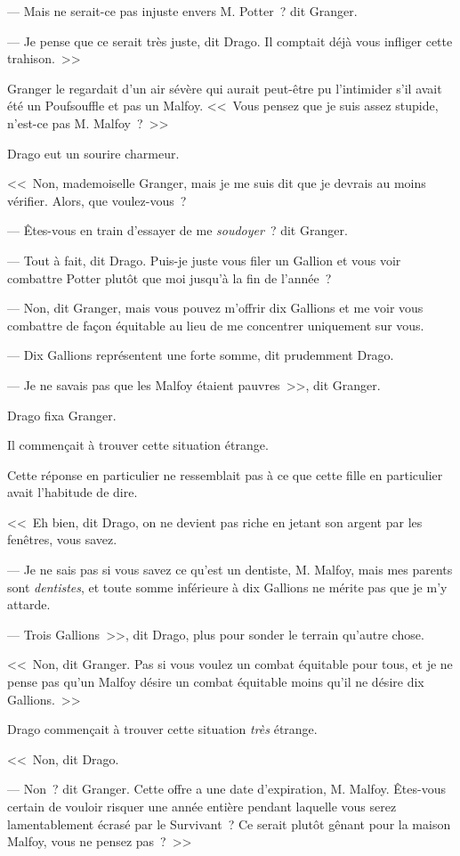 --- Mais ne serait-ce pas injuste envers M. Potter~? dit Granger.

--- Je pense que ce serait très juste, dit Drago. Il comptait déjà vous infliger cette trahison.~>>

Granger le regardait d'un air sévère qui aurait peut-être pu l'intimider s'il avait été un Poufsouffle et pas un Malfoy. <<~Vous pensez que je suis assez stupide, n'est-ce pas M. Malfoy~?~>>

Drago eut un sourire charmeur.

<<~Non, mademoiselle Granger, mais je me suis dit que je devrais au moins vérifier. Alors, que voulez-vous~?

--- Êtes-vous en train d'essayer de me \emph{soudoyer}~? dit Granger.

--- Tout à fait, dit Drago. Puis-je juste vous filer un Gallion et vous voir combattre Potter plutôt que moi jusqu'à la fin de l'année~?

--- Non, dit Granger, mais vous pouvez m'offrir dix Gallions et me voir vous combattre de façon équitable au lieu de me concentrer uniquement sur vous.

--- Dix Gallions représentent une forte somme, dit prudemment Drago.

--- Je ne savais pas que les Malfoy étaient pauvres~>>, dit Granger.

Drago fixa Granger.

Il commençait à trouver cette situation étrange.

Cette réponse en particulier ne ressemblait pas à ce que cette fille en particulier avait l'habitude de dire.

<<~Eh bien, dit Drago, on ne devient pas riche en jetant son argent par les fenêtres, vous savez.

--- Je ne sais pas si vous savez ce qu'est un dentiste, M. Malfoy, mais mes parents sont \emph{dentistes}, et toute somme inférieure à dix Gallions ne mérite pas que je m'y attarde.

--- Trois Gallions~>>, dit Drago, plus pour sonder le terrain qu'autre chose.

<<~Non, dit Granger. Pas si vous voulez un combat équitable pour tous, et je ne pense pas qu'un Malfoy désire un combat équitable moins qu'il ne désire dix Gallions.~>>

Drago commençait à trouver cette situation \emph{très} étrange.

<<~Non, dit Drago.

--- Non~? dit Granger. Cette offre a une date d'expiration, M. Malfoy. Êtes-vous certain de vouloir risquer une année entière pendant laquelle vous serez lamentablement écrasé par le Survivant~? Ce serait plutôt gênant pour la maison Malfoy, vous ne pensez pas~?~>>

